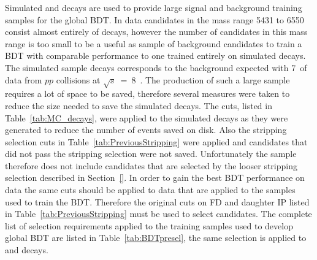 Simulated \bsmumu and \bbbarmumux decays are used to provide large signal and background training samples for the global BDT. In data \bsmumu candidates in the mass range 5431 to 6550 \mevcc consist almost entirely of \bbbarmumux decays, however the number of candidates in this mass range is too small to be a useful as sample of background candidates to train a BDT with comparable performance to one trained entirely on simulated decays. 
The simulated sample \bbbarmumux decays corresponds to the background expected with 7~\fb of data from $pp$ collisions at $\sqrt{s}$~=~8~\tev. The production of such a large sample requires a lot of space to be saved, therefore several measures were taken to reduce the size needed to save the simulated \bbbarmumux decays. The cuts, listed in Table~\ref{tab:MC_decays}, were applied to the simulated decays as they were generated to reduce the number of events saved on disk. Also the stripping selection cuts in Table~\ref{tab:PreviousStripping} were applied and candidates that did not pass the stripping selection were not saved. Unfortunately the \bbbarmumux sample therefore does not include candidates that are selected by the looser stripping selection described in Section~\ref{}. In order to gain the best BDT performance on data the same cuts should be applied to data that are applied to the samples used to train the BDT. Therefore the original cuts on FD \chisqd and daughter IP \chisqd listed in Table~\ref{tab:PreviousStripping} must be used to select \bsmumu candidates. 
The complete list of selection requirements applied to the training samples used to develop global BDT are listed in Table~\ref{tab:BDTpresel}, the same selection is applied to \bsmumu and \bbbarmumux decays.  
